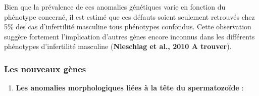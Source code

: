 \documentclass[12pt,twoside]{reedthesis}
\providecommand{\tightlist}{%
  \setlength{\itemsep}{0pt}\setlength{\parskip}{0pt}}
\theoremstyle{definition}
\theoremstyle{definition}
\theoremstyle{remark}
\begin{document}
  Bien que la prévalence de ces anomalies génétiques varie en fonction du
  phénotype concerné, il est estimé que ces défauts soient seulement
  retrouvés chez 5\% des cas d'infertilité masculine tous phénotypes
  confondus. Cette observation suggère fortement l'implication d'autres
  gènes encore inconnus dans les différents phénotypes d'infertilité
  masculine (\textbf{Nieschlag et al., 2010 A trouver}).
  
  \subsubsection{Les nouveaux gènes}\label{les-nouveaux-genes}
  
  \begin{enumerate}
  \def\labelenumi{\arabic{enumi}.}
  \tightlist
  \item
    \textbf{Les anomalies morphologiques liées à la tête du spermatozoïde}
    :
  

\end{enumerate}
\end{document}
